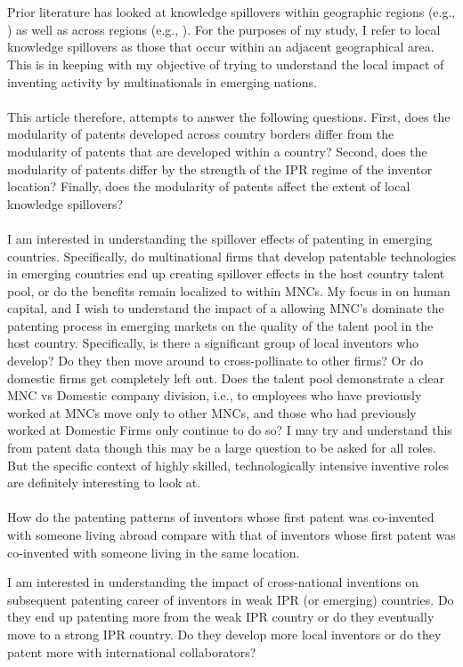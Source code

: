 \documentclass[12pt]{article}
\begin{document}
\\\\
Prior literature has looked at knowledge spillovers within geographic regions (e.g., \cite{Jaffe1993}) as well as across regions (e.g., \cite{Singh2007}). For the purposes of my study, I refer to local knowledge spillovers as those that occur within an adjacent geographical area. This is in keeping with my objective of trying to understand the local impact of inventing activity by multinationals in emerging nations. 
\\\\
This article therefore, attempts to answer the following questions. First, does the modularity of patents developed across country borders differ from the modularity of patents that are developed within a country? Second, does the modularity of patents differ by the strength of the IPR regime of the inventor location? Finally, does the modularity of patents affect the extent of local knowledge spillovers? 
\\\\
I am interested in understanding the spillover effects of patenting in emerging countries. Specifically, do multinational firms that develop patentable technologies in emerging countries end up creating spillover effects in the host country talent pool, or do the benefits remain localized to within MNCs. My focus in on human capital, and I wish to understand the impact of a allowing MNC's dominate the patenting process in emerging markets on the quality of the talent pool in the host country. Specifically, is there a significant group of local inventors who develop? Do they then move around to cross-pollinate to other firms? Or do domestic firms get completely left out. Does the talent pool demonstrate a clear MNC vs Domestic company division, i.e., to employees who have previously worked at MNCs move only to other MNCs, and those who had previously worked at Domestic Firms only continue to do so? I may try and understand this from patent data though this may be a large question to be asked for all roles. But the specific context of highly skilled, technologically intensive inventive roles are definitely interesting to look at.
\\\\
How do the patenting patterns of inventors whose first patent was co-invented with someone living abroad compare with that of inventors whose first patent was co-invented with someone living in the same location.

I am interested in understanding the impact of cross-national inventions on subsequent patenting career of inventors in weak IPR (or emerging) countries. Do they end up patenting more from the weak IPR country or do they eventually move to a strong IPR country. Do they develop more local inventors or do they patent more with international collaborators?
\end{document}

